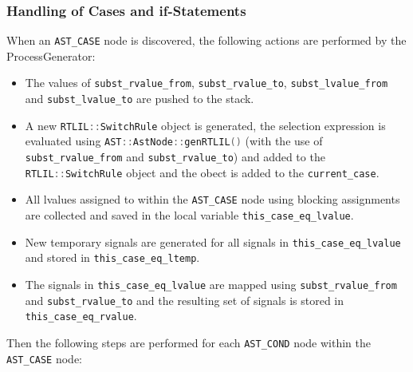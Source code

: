 \subsubsection{Handling of Cases and if-Statements}

\begin{sloppypar}
When an {\tt AST\_CASE} node is discovered, the following actions are performed by
the ProcessGenerator:

\begin{itemize}
\item The values of \lstinline[language=C++]{subst_rvalue_from}, \lstinline[language=C++]{subst_rvalue_to},
\lstinline[language=C++]{subst_lvalue_from} and \lstinline[language=C++]{subst_lvalue_to} are pushed to the stack.
%
\item A new \lstinline[language=C++]{RTLIL::SwitchRule} object is generated, the selection expression is evaluated using
\lstinline[language=C++]{AST::AstNode::genRTLIL()} (with the use of \lstinline[language=C++]{subst_rvalue_from} and
\lstinline[language=C++]{subst_rvalue_to}) and added to the \lstinline[language=C++]{RTLIL::SwitchRule} object and the
obect is added to the \lstinline[language=C++]{current_case}.
%
\item All lvalues assigned to within the {\tt AST\_CASE} node using blocking assignments are collected and
saved in the local variable \lstinline[language=C++]{this_case_eq_lvalue}.
%
\item New temporary signals are generated for all signals in \lstinline[language=C++]{this_case_eq_lvalue} and stored
in \lstinline[language=C++]{this_case_eq_ltemp}.
%
\item The signals in \lstinline[language=C++]{this_case_eq_lvalue} are mapped using \lstinline[language=C++]{subst_rvalue_from}
and \lstinline[language=C++]{subst_rvalue_to} and the resulting set of signals is stored in
\lstinline[language=C++]{this_case_eq_rvalue}.
\end{itemize}

Then the following steps are performed for each {\tt AST\_COND} node within the {\tt AST\_CASE} node:


\end{sloppypar}
